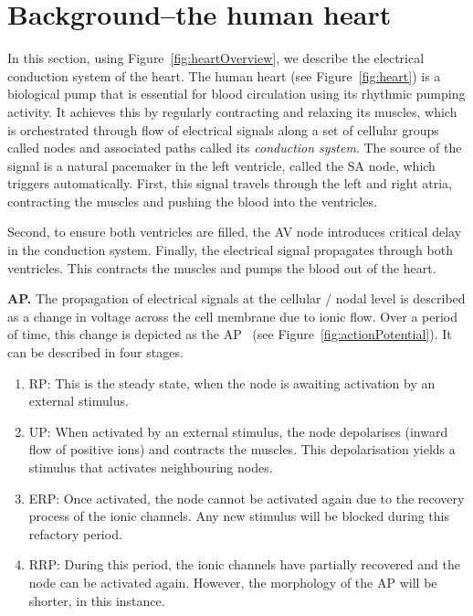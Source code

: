 \section{Background--the human heart }

In this section, using Figure~\ref{fig:heartOverview}, we describe the
electrical conduction system of the heart.
The human heart (see Figure~\ref{fig:heart}) is a biological pump that
is essential for blood circulation using its rhythmic pumping activity.
It achieves this by regularly contracting and relaxing its muscles,
which is orchestrated through flow of electrical signals along a set of
cellular groups called nodes and associated paths called its
\emph{conduction system}. The source of the signal is a natural pacemaker in the left ventricle, called the \ac{SA} node, which triggers
automatically. First, this signal travels through the left and right
atria, contracting the muscles and pushing the blood into the
ventricles.

Second, to ensure both ventricles are filled, the \ac{AV} node
introduces critical delay in the conduction system. Finally, the
electrical signal propagates through both ventricles. This contracts the
muscles and pumps the blood out of the heart.

\noindent \textbf{\acf{AP}.} The propagation of electrical signals at
the cellular / nodal level is described as a change in voltage across
the cell membrane due to ionic flow. Over a period of time, this change
is depicted as the \acf{AP}~\cite{chen14} (see 
Figure~\ref{fig:actionPotential}). It can be described in four
stages.
\begin{enumerate}
\item \acf{RP}: This is the steady state, when the node is awaiting
  activation by an external stimulus.
\item \acf{UP}: When activated by an external stimulus, the node
  depolarises (inward flow of positive ions) and contracts the
  muscles. This depolarisation yields a stimulus that activates
  neighbouring nodes.
\item \acf{ERP}: Once activated, the node cannot be activated again due
  to the recovery process of the ionic channels. Any new stimulus will
  be blocked during this refactory period.
\item \acf{RRP}: During this period, the ionic channels have partially
  recovered and the node can be activated again. However, the morphology
  of the \ac{AP} will be shorter, in this instance.

\end{enumerate}

